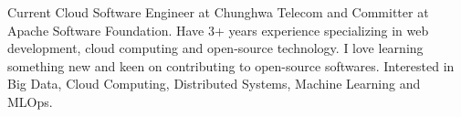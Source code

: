 

\begin{cvparagraph}

Current Cloud Software Engineer at Chunghwa Telecom and Committer at Apache Software Foundation. Have 3+ years experience specializing in web development, cloud computing and open-source technology. I love learning something new and keen on contributing to open-source softwares. Interested in Big Data, Cloud Computing, Distributed Systems, Machine Learning and MLOps.
\end{cvparagraph}
